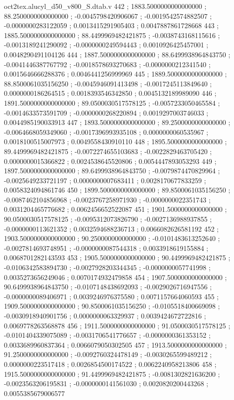\begin{filecontents}[overwrite]{oct2tex.alucyl_d50_v800_S.dtab.v}
442 ; 1883.5000000000000000 ; 88.2500000000000000 ; -0.0045798420906067 ; -0.0019542574882507 ; -0.0000000283122059 ; 0.0013415291905403 ; 0.0047887861728668
443 ; 1885.5000000000000000 ; 88.4499969482421875 ; -0.0038743168115616 ; -0.0013189241290092 ; -0.0000000249594443 ; 0.0010926425457001 ; 0.0048290491104126
444 ; 1887.5000000000000000 ; 88.6499938964843750 ; -0.0041446387767792 ; -0.0018578693270683 ; -0.0000000212341540 ; 0.0015646666288376 ; 0.0046441256999969
445 ; 1889.5000000000000000 ; 88.8500061035156250 ; -0.0045946091413498 ; -0.0017245113849640 ; 0.0000000186264515 ; 0.0018393546342850 ; 0.0045132189989090
446 ; 1891.5000000000000000 ; 89.0500030517578125 ; -0.0057233050465584 ; -0.0014633573591709 ; -0.0000000268220894 ; 0.0019297003746033 ; 0.0044985190033913
447 ; 1893.5000000000000000 ; 89.2500000000000000 ; -0.0064668059349060 ; -0.0017396993935108 ; 0.0000000060535967 ; 0.0018100515007973 ; 0.0049558430910110
448 ; 1895.5000000000000000 ; 89.4499969482421875 ; -0.0072274655103683 ; -0.0022829463705420 ; 0.0000000015366822 ; 0.0024538645520806 ; 0.0054447893053293
449 ; 1897.5000000000000000 ; 89.6499938964843750 ; -0.0079874470829964 ; -0.0025649233721197 ; 0.0000000007683411 ; 0.0028170677833259 ; 0.0058324094861746
450 ; 1899.5000000000000000 ; 89.8500061035156250 ; -0.0087462104856968 ; -0.0023767258971930 ; -0.0000000022351743 ; 0.0031204465776682 ; 0.0062456652522087
451 ; 1901.5000000000000000 ; 90.0500030517578125 ; -0.0095312073826790 ; -0.0027136988937855 ; -0.0000000113621352 ; 0.0032594688236713 ; 0.0066082626581192
452 ; 1903.5000000000000000 ; 90.2500000000000000 ; -0.0101483613252640 ; -0.0027814693748951 ; -0.0000000087544318 ; 0.0033918619155884 ; 0.0068701282143593
453 ; 1905.5000000000000000 ; 90.4499969482421875 ; -0.0106342583894730 ; -0.0027928203344345 ; -0.0000000057741998 ; 0.0035273656249046 ; 0.0070174932479858
454 ; 1907.5000000000000000 ; 90.6499938964843750 ; -0.0107148438692093 ; -0.0029026716947556 ; -0.0000000089406971 ; 0.0039246976375580 ; 0.0071157664060593
455 ; 1909.5000000000000000 ; 90.8500061035156250 ; -0.0105518400669098 ; -0.0030918940901756 ; 0.0000000063329937 ; 0.0039424672722816 ; 0.0069778263568878
456 ; 1911.5000000000000000 ; 91.0500030517578125 ; -0.0101404339075089 ; -0.0031706541776657 ; -0.0000000361353152 ; 0.0033689960837364 ; 0.0066079050302505
457 ; 1913.5000000000000000 ; 91.2500000000000000 ; -0.0092760324478149 ; -0.0030265599489212 ; 0.0000000223517418 ; 0.0026854500174522 ; 0.0062240958213806
458 ; 1915.5000000000000000 ; 91.4499969482421875 ; -0.0081302821636200 ; -0.0023563206195831 ; -0.0000000141561030 ; 0.0020820200443268 ; 0.0055385679006577

\end{filecontents}
